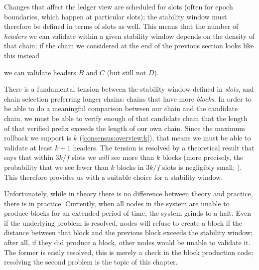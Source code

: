 Changes that affect the ledger view are scheduled for slots (often
for epoch boundaries, which happen at particular slots); the stability window
must therefore be defined in terms of slots as well. This means that
the number of \emph{headers} we can validate within a given stability window
depends on the density of that chain; if the chain we considered at the end
of the previous section looks like this instead
%
\begin{center}
\end{center}
%
we can validate headers $B$ and $C$ (but still not $D$).

There is a fundamental tension between the stability window defined in
\emph{slots}, and chain selection preferring  longer chains: chains that have
more \emph{blocks}. In order to be able to do a meaningful comparison between
our chain and the candidate chain, we must be able to verify enough of that
candidate chain that the length of that verified prefix exceeds the length of
our own chain. Since the maximum rollback we support is $k$
(\cref{consensus:overview:k}), that means we must be able to validate at least
$k + 1$ headers. The tension is resolved by a theoretical result that says that
within $3k/f$ slots we \emph{will} see more than $k$ blocks (more precisely, the
probability that we see fewer than $k$ blocks in $3k/f$ slots is negligibly
small; \cite{cryptoeprint:2017:573}). This therefore provides us with a suitable
choice for a stability window.

Unfortunately, while in theory there is no difference between theory and
practice, there is in practice. Currently, when all nodes in the system are
unable to produce blocks for an extended period of time, the system grinds to a
halt. Even if the underlying problem is resolved, nodes will refuse to create a
block if the distance between that block and the previous block exceeds the
stability window; after all, if they did produce a block, other nodes would be
unable to validate it. The former is easily resolved, this is merely a check in
the block production code; resolving the second problem is the topic of this
chapter.

